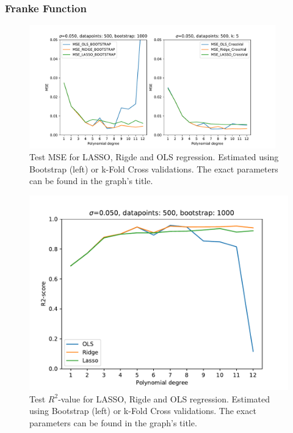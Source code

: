\documentclass[11pt,a4paper,titlepage]{article}
\begin{document}
\subsubsection{Franke Function}
\begin{figure}[H]
\centering
\includegraphics[width=0.95\textwidth]{MSE_different_methods_Franke.pdf}
\caption[Test MSE for LASSO, Rigde and OLS regression]{Test MSE for LASSO, Rigde and OLS regression. Estimated using Bootstrap (left) or k-Fold Cross validations. The exact parameters can be found in the graph's title.}
\label{fig:MSE_different_methods_Franke}
\end{figure}
\begin{figure}[H]
\centering
\includegraphics[trim=0.7cm 0.2cm 1cm 0.85cm, clip=true,scale = 0.7]{R2_bootstrap_different_methods_Franke.pdf}
\caption[Test $R^2$-value for LASSO, Rigde and OLS regression]{Test $R^2$-value for LASSO, Rigde and OLS regression. Estimated using Bootstrap (left) or k-Fold Cross validations. The exact parameters can be found in the graph's title.}
\label{fig:R2_different_methods_Franke}
\end{figure}
\end{document}
